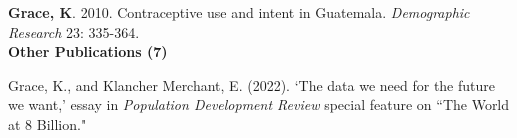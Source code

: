 \documentclass[11pt]{article} %
\begin{document}
\noindent
\textbf{Grace, K}. 2010. Contraceptive use and intent in Guatemala.  \textit{Demographic Research} 23: 335-364.\\


































\noindent
\textbf {Other Publications (7)}

\noindent

\noindent
Grace, K., and Klancher Merchant, E. (2022). `The data we need for the future we want,' essay in \textit{Population Development Review} special feature on ``The World at 8 Billion."\\
\end{document}
